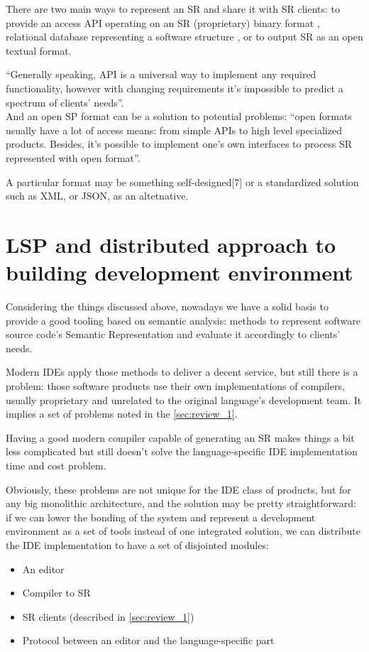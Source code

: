 There are two main ways to represent an SR and share it with SR clients: to
provide an access API operating on an SR (proprietary) binary format \cite{Cannon, FreeSoftwareFoundation2016},
relational database representing a software structure \cite{Linton1983}, or to output SR as an
open textual format\cite{TheRustTeam2016}.

“Generally speaking, API is a universal way to implement any required
functionality, however with changing requirements it’s impossible to predict a
spectrum of clients’ needs”.\\
And an open SP format can be a solution to potential problems: “open formats
usually have a lot of access means: from simple APIs to high level specialized
products. Besides, it’s possible to implement one’s own interfaces to process SR
represented with open format”.\cite{Zouev2005}

A particular format may be something self-designed[7] or a standardized
solution such as XML\cite{Germon}, or JSON\cite{ECMA-4042013}, as an altetnative.

\section{LSP and distributed approach to building development
environment}
\label{sec:review_3}

Considering the things discussed above, nowadays we have a solid basis to
provide a good tooling based on semantic analysis: methods to represent
software source code’s Semantic Representation and evaluate it accordingly to
clients’ needs.

Modern IDEs apply those methods to deliver a decent service, but still there is a
problem: those software products use their own implementations of compilers,
usually proprietary and unrelated to the original language’s development team.
It implies a set of problems noted in the \ref{sec:review_1}.

Having a good modern compiler capable of generating an SR makes things a bit
less complicated but still doesn’t solve the language-specific IDE
implementation time and cost problem.

Obviously, these problems are not unique for the IDE class of products, but for
any big monolithic architecture, and the solution may be pretty straightforward:
if we can lower the bonding of the system and represent a development
environment as a set of tools instead of one integrated solution, we can
distribute the IDE implementation to have a set of disjointed modules:
\begin{itemize}
    \item An editor
    \item Compiler to SR
    \item SR clients (described in \ref{sec:review_1})
    \item Protocol between an editor and the language-specific part
\end{itemize}

